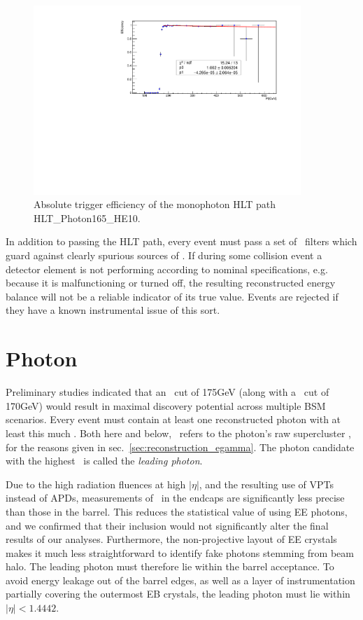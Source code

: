 \begin{figure}[hbtp]
  \begin{center}
    \includegraphics[width=0.90\textwidth]{Figures/triggereff.pdf}
    \caption{
    Absolute trigger efficiency of the monophoton HLT path HLT\_Photon165\_HE10.
    }
    \label{fig:trigger_efficiency}
  \end{center}
\end{figure}

In addition to passing the HLT path, every event must pass a set of \MET\ filters which guard against clearly spurious sources of \MET. If during some collision event
a detector element is not performing according to nominal specifications, e.g. because it is malfunctioning or turned off, the resulting reconstructed energy balance will
not be a reliable indicator of its true value. Events are rejected if they have a known instrumental issue of this sort.

\section{Photon} \label{sec:event_selection_photon}
Preliminary studies indicated that an \ETgamma\ cut of 175\unit{GeV} (along with a \MET\ cut of 170\unit{GeV}) would result in maximal discovery potential across
multiple BSM scenarios. Every event must contain at least one reconstructed photon with at least this much \ETgamma. Both here and below,
\ETgamma\ refers to the photon's raw supercluster \ET, for the reasons given in sec.~\ref{sec:reconstruction_egamma}. The photon candidate with the highest
\ETgamma\ is called the \textit{leading photon}.

Due to the high radiation fluences at high $|\eta|$, and the resulting use of VPTs instead of APDs, measurements of \ETgamma\ in the endcaps are significantly less precise
than those in the barrel. This reduces the statistical value of using EE photons, and we confirmed that their inclusion would not significantly alter the final results
of our analyses. Furthermore, the non-projective layout of EE crystals makes it much less straightforward to identify fake photons stemming from beam halo.
The leading photon must therefore lie within the barrel acceptance. To avoid energy leakage out of the barrel edges, as well as a layer of instrumentation partially
covering the outermost EB crystals, the leading photon must lie within $|\eta| < 1.4442$.

